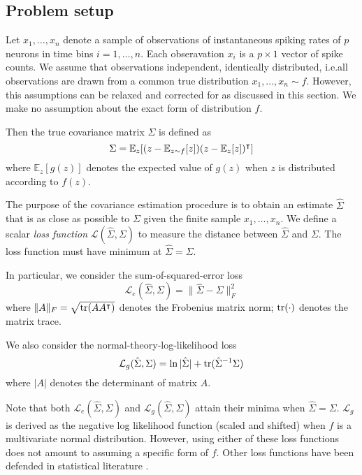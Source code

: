\subsection{Problem setup}
Let $x_1,\ldots,x_n$ denote a sample of observations of instantaneous spiking rates of $p$ neurons in time bins $i=1,\ldots,n$.  Each obseravation $x_i$ is a $p\times 1$ vector of spike counts.  We assume that observations independent, identically distributed, i.e.\;all observations are drawn from a common true distribution $x_1,\ldots,x_n \sim f$.  However, this assumptions can be relaxed and corrected for as discussed in this section. We make no assumption about the exact form of distribution $f$. 

Then the true  covariance matrix $\Sigma$ is defined as
\begin{equation}
\Sigma =\mathbb E_z[ (z-\mathbb E_{z\sim f} [z])(z-\mathbb E_z [z])^\intercal]
\end{equation}
where $\mathbb E_z[g(z)]$ denotes the expected value of $g(z)$ when $z$ is distributed according to $f(z)$. 

The purpose of the covariance estimation procedure is to obtain an estimate $\hat \Sigma$ that is as close as possible to $\Sigma$ given the finite sample  $x_1,\ldots,x_n$. We define a scalar \emph{loss function} $\mathcal L\left(\hat \Sigma, \Sigma\right)$ to measure the distance between $\hat \Sigma$ and $\Sigma$.  The loss function must have minimum at $\hat \Sigma=\Sigma$. 

In particular, we consider the sum-of-squared-error loss
\begin{equation}
\mathcal L_e(\hat \Sigma, \Sigma) =  \| \hat \Sigma - \Sigma\|^2_F 
\end{equation}
where $\| A \|_F = \sqrt{\operatorname{tr}(AA^\intercal)}$ denotes the Frobenius matrix norm; $\operatorname{tr}(\cdot)$ denotes the matrix trace.

We also consider the normal-theory-log-likelihood loss
\begin{equation}
\mathcal L_g(\hat \Sigma,\Sigma) = \ln |\hat \Sigma|  + \operatorname{tr}(\hat \Sigma^{-1}\Sigma)
\end{equation}
where $|A|$ denotes the determinant of matrix $A$.

Note that both $\mathcal L_e(\hat\Sigma,\Sigma)$ and $\mathcal L_g(\hat\Sigma,\Sigma)$ attain their minima when $\hat\Sigma = \Sigma$.   $\mathcal L_g$ is derived as the negative log likelihood function (scaled and shifted) when $f$ is a multivariate normal distribution.  However, using either of these loss functions does not amount to assuming a specific form of $f$. Other loss functions have been defended in statistical literature \citep{James:1961,Fan:2008}.  




